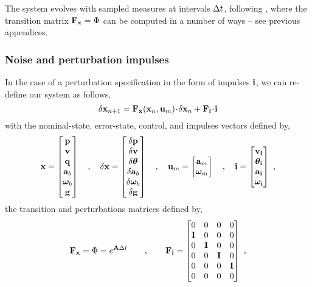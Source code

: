 The system evolves with sampled measures at intervals $\Delta t$, following , where the transition matrix ${\bf F}_{\bf x}=\Phi$ can be computed in a number of ways -- see previous appendices. 

\subsubsection{Noise and perturbation impulses}


In the case of a perturbation specification in the form of impulses ${\bf i}$, we can re-define our system as follows,
%
\begin{equation}
\delta{\bf x}_{n+1} = {\bf F}_{\bf x}({\bf x}_n, {\bf u}_m)\!\cdot\! \delta{\bf x}_n+{\bf F}_{\bf i}\!\cdot\!{\bf i}
\end{equation}
%
with the nominal-state, error-state, control, and impulses vectors defined by,
%
\begin{equation}
{\bf x}=\begin{bmatrix}{\bf p}\\{\bf v}\\{\bf q}\\{\bf a}_b\\{\bm \omega}_b\\{\bf g}\end{bmatrix} \quad, \quad
\delta{\bf x}=\begin{bmatrix}\delta{\bf p}\\\delta{\bf v}\\\delta{\bm \theta}\\\delta{\bf a}_b\\\delta{\bm \omega}_b\\\delta{\bf g}\end{bmatrix} \quad, \quad
{\bf u}_m = \begin{bmatrix}
{\bf a}_m \\
{\bm \omega}_m
\end{bmatrix} 
\quad,  \quad
{\bf i} = \begin{bmatrix}
{\bf v}_{\bf i} \\
{\bm \theta}_{\bf i} \\
{\bf a}_{\bf i} \\
{\bm \omega}_{\bf i}
\end{bmatrix}~,
\end{equation}
%
the transition and perturbations matrices defined by,
%
\begin{equation}
{\bf F}_{\bf x} = \Phi = e^{{\bf A}\Delta t}
\qquad,\qquad
{\bf F}_{\bf i} 
= \begin{bmatrix}
 0 &  0 & 0 & 0 \\
 {\bf I} &  0 & 0 & 0 \\
 0 &  {\bf I} & 0 & 0 \\
 0 &  0 & {\bf I} & 0 \\
 0 & 0 & 0 & {\bf I} \\
 0 &  0 & 0 & 0 
\end{bmatrix} ~,
\end{equation}

